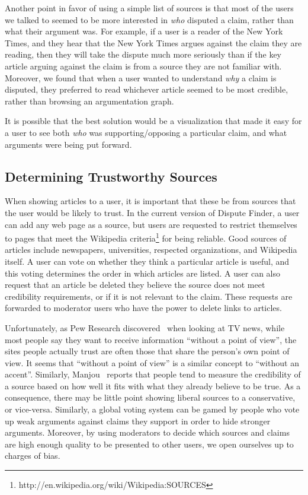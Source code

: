\documentclass{www2010-submission}
\begin{document}
Another point in favor of using a simple list of sources is that most of the users we talked to seemed to be more interested in {\it who} disputed a claim, rather than what their argument was. For example, if a user is a reader of the New York Times, and they hear that the New York Times argues against the claim they are reading, then they will take the dispute much more seriously than if the key article arguing against the claim is from a source they are not familiar with. Moreover, we found that when a user wanted to understand {\it why} a claim is disputed, they preferred to read whichever article seemed to be most credible, rather than browsing an argumentation graph.

It is possible that the best solution would be a visualization that made it easy for a user to see both {\it who} was supporting/opposing a particular claim, and what arguments were being put forward.


\subsection{Determining Trustworthy Sources}

When showing articles to a user, it is important that these be from sources that the user would be likely to trust. In the current version of Dispute Finder, a user can add any web page as a source, but users are requested to restrict themselves to pages that meet the Wikipedia criteria\footnote{http://en.wikipedia.org/wiki/Wikipedia:SOURCES} for being reliable. Good sources of articles include newspapers, universities, respected organizations, and Wikipedia itself. A user can vote on whether they think a particular article is useful, and this voting determines the order in which articles are listed. A user can also request that an article be deleted they believe the source does not meet credibility requirements, or if it is not relevant to the claim. These requests are forwarded to moderator users who have the power to delete links to articles.

Unfortunately, as Pew Research discovered~\cite{PewResearch2008} when looking at TV news, while most people say they want to receive information ``without a point of view'', the sites people actually trust are often those that share the person's own point of view. It seems that ``without a point of view'' is a similar concept to ``without an accent''. Similarly, Manjou~\cite{Manjou2008} reports that people tend to measure the credibility of a source based on how well it fits with what they already believe to be true.  As a consequence, there may be little point showing liberal sources to a conservative, or vice-versa. Similarly, a global voting system can be gamed by people who vote up weak arguments against claims they support in order to hide stronger arguments. Moreover, by using moderators to decide which sources and claims are high enough quality to be presented to other users, we open ourselves up to charges of bias.
\end{document}
